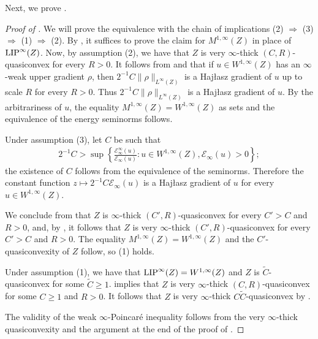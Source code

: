 \documentclass[reqno]{amsart}
\newcommand{\LIP}{{\rm LIP}}
\numberwithin{equation}{section}
\theoremstyle{remark}
\begin{document}
Next, we prove .
\begin{proof}[Proof of ]
We will prove the equivalence with the chain of implications (2) $\Rightarrow$ (3) $\Rightarrow$ (1) $\Rightarrow$ (2). By , it suffices to prove the claim for $M^{1,\infty}(Z)$ in place of $\LIP^{\infty}(Z)$. Now, by assumption (2), we have that $Z$ is very $\infty$-thick $(C,R)$-quasiconvex for every $R > 0$. It follows from  and  that if $u \in W^{1,\infty}(Z)$ has an $\infty$-weak upper gradient $\rho$, then $2^{-1}C \| \rho \|_{ L^{\infty}(Z) }$ is a Haj{\l}asz gradient of $u$ up to scale $R$ for every $R > 0$. Thus $2^{-1}C\| \rho \|_{ L^{\infty}(Z) }$ is a Haj{\l}asz gradient of $u$. By the arbitrariness of $u$, the equality $M^{1,\infty}(Z) = W^{1,\infty}(Z)$ as sets and the equivalence of the energy seminorms follows.

Under assumption (3), let $C$ be such that
\begin{align*}
    2^{-1}C
    >
    \sup
    \left\{
        \frac{ \mathcal{E}_{\infty}^{\infty}(u) }{ \mathscr{E}_{\infty}(u) }
        \colon
        u \in W^{1,\infty}(Z), \mathscr{E}_{\infty}(u) > 0
    \right\};
\end{align*}
the existence of $C$ follows from the equivalence of the seminorms. Therefore the constant function $z \mapsto 2^{-1}C\mathscr{E}_{\infty}(u)$ is a Haj{\l}asz gradient of $u$ for every $u \in W^{1,\infty}(Z)$.

We conclude from  that $Z$ is $\infty$-thick $( C', R )$-quasiconvex for every $C' > C$ and $R > 0$, and, by , it follows that $Z$ is very $\infty$-thick $( C', R )$-quasiconvex for every $C' > C$ and $R > 0$. The equality $M^{1,\infty}(Z) = W^{1,\infty}(Z)$ and the $C'$-quasiconvexity of $Z$ follow, so (1) holds.

Under assumption (1), we have that $\LIP^{\infty}(Z) = W^{1,\infty}(Z)$ and $Z$ is $\widetilde{C}$-quasiconvex for some $\widetilde{C} \geq 1$.  implies that $Z$ is very $\infty$-thick $( C, R )$-quasiconvex for some $C\geq 1$ and $R > 0$. It follows that $Z$ is very $\infty$-thick $C\widetilde{C}$-quasiconvex by .

The validity of the weak $\infty$-Poincaré inequality follows from the very $\infty$-thick quasiconvexity and the argument at the end of the proof of .
\end{proof}
\end{document}
